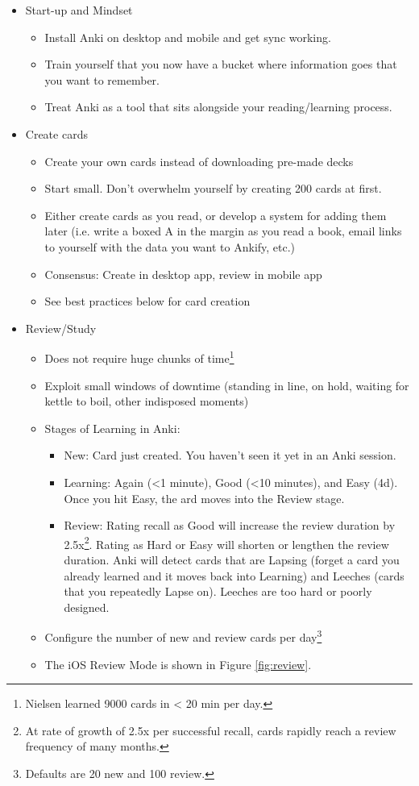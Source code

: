 \documentclass[]{tufte-handout}
\begin{document}
\begin{itemize}
	\item Start-up and Mindset

	\begin{itemize}
		\item Install Anki on desktop and mobile and get sync working.
		\item Train yourself that you now have a bucket where information goes that you want to remember.
		\item Treat Anki as a tool that sits alongside your reading/learning process.
	\end{itemize}

	\item Create cards
	\begin{itemize}
		\item Create your own cards instead of downloading pre-made decks
		\item Start small. Don't overwhelm yourself by creating 200 cards at first.
		\item Either create cards as you read, or develop a system for adding them later (i.e. write a boxed A in the margin as you read a book, email links to yourself with the data you want to Ankify, etc.)
		\item Consensus: Create in desktop app, review in mobile app
		\item See best practices below for card creation
	\end{itemize}

	\item Review/Study
	\begin{itemize}
		\item Does not require huge chunks of time\footnote{Nielsen learned 9000 cards in < 20 min per day.}
		\item Exploit small windows of downtime (standing in line, on hold, waiting for kettle to boil, other indisposed moments)
		\item Stages of Learning in Anki:
		\begin{itemize}
			\item New: Card just created. You haven't seen it yet in an Anki session.
			\item Learning: Again (<1 minute), Good (<10 minutes), and Easy (4d). Once you hit Easy, the ard moves into the Review stage.
			\item Review: Rating recall as Good will increase the review duration by 2.5x\footnote{At rate of growth of 2.5x per successful recall, cards rapidly reach a review frequency of many months.}. Rating as Hard or Easy will shorten or lengthen the review duration. Anki will detect cards that are Lapsing (forget a card you already learned and it moves back into Learning) and Leeches (cards that you repeatedly Lapse on). Leeches are too hard or poorly designed.
		\end{itemize}
		\item Configure the number of new and review cards per day\footnote{Defaults are 20 new and 100 review.}
		\item The iOS Review Mode is shown in Figure \ref{fig:review}.


\end{itemize}
\end{itemize}
\end{document}
